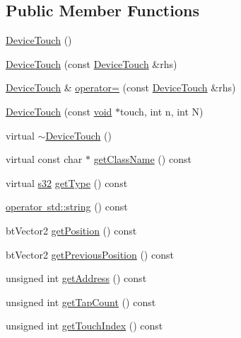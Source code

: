 \subsection*{Public Member Functions}
\begin{DoxyCompactItemize}
\item 
\mbox{\hyperlink{classnjli_1_1_device_touch_aa56351410e0c6fe7ced6fafd4cde27f4}{Device\+Touch}} ()
\item 
\mbox{\hyperlink{classnjli_1_1_device_touch_aa34b346fb2574885542d03fe8170ecbc}{Device\+Touch}} (const \mbox{\hyperlink{classnjli_1_1_device_touch}{Device\+Touch}} \&rhs)
\item 
\mbox{\hyperlink{classnjli_1_1_device_touch}{Device\+Touch}} \& \mbox{\hyperlink{classnjli_1_1_device_touch_aafb174d178edb785547de79d2c561417}{operator=}} (const \mbox{\hyperlink{classnjli_1_1_device_touch}{Device\+Touch}} \&rhs)
\item 
\mbox{\hyperlink{classnjli_1_1_device_touch_aa0c19c372c26f011e3b60f0fbc5e8c87}{Device\+Touch}} (const \mbox{\hyperlink{_thread_8h_af1e856da2e658414cb2456cb6f7ebc66}{void}} $\ast$touch, int n, int N)
\item 
virtual \mbox{\hyperlink{classnjli_1_1_device_touch_adc6021981c650837f9ddb1486972a9a2}{$\sim$\+Device\+Touch}} ()
\item 
virtual const char $\ast$ \mbox{\hyperlink{classnjli_1_1_device_touch_a0bf7b53fef161666e8c70bf2482be1c8}{get\+Class\+Name}} () const
\item 
virtual \mbox{\hyperlink{_util_8h_aa62c75d314a0d1f37f79c4b73b2292e2}{s32}} \mbox{\hyperlink{classnjli_1_1_device_touch_a1920ad95ef19b482f4285c44a1675ee6}{get\+Type}} () const
\item 
\mbox{\hyperlink{classnjli_1_1_device_touch_a8992899c7e9e28c7f003c8e1d3e8fe68}{operator std\+::string}} () const
\item 
bt\+Vector2 \mbox{\hyperlink{classnjli_1_1_device_touch_aefb706600a5f23104c7dd8808ffe4e2d}{get\+Position}} () const
\item 
bt\+Vector2 \mbox{\hyperlink{classnjli_1_1_device_touch_a4808a978398d3bd79d49c389d7a3752e}{get\+Previous\+Position}} () const
\item 
unsigned int \mbox{\hyperlink{classnjli_1_1_device_touch_a28c015bf3cf07e3c9925b52cb457cd0a}{get\+Address}} () const
\item 
unsigned int \mbox{\hyperlink{classnjli_1_1_device_touch_a621adf317a60ce54643b076dd80e9b13}{get\+Tap\+Count}} () const
\item 
unsigned int \mbox{\hyperlink{classnjli_1_1_device_touch_ae2c94bd858111f25c7f738ebc103ef21}{get\+Touch\+Index}} () const

\end{DoxyCompactItemize}
